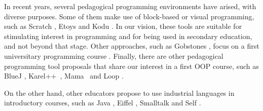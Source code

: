 


In recent years, several pedagogical programming environments have arised, with diverse purposes.
Some of them make use of block-based or visual programming, 
such as Scratch \cite{malan_scratch_2007}, Etoys \cite{lee_empowering_2011} and Kodu \cite{kodu}. 
In our vision, these tools are suitable for stimulating interest in programming and for being used in secondary education, and not beyond that stage.
Other approaches, such as Gobstones \cite{lopez_nombre_2012}, focus on a first universitary programming course%
.
Finally, there are other pedagogical programming tool proposals that share our interest in a first OOP course, such as BlueJ \cite{bennedsen_bluej_2010}, Karel++~\cite{bergin_karel++:_1996}, Mama~\cite{harrisonmama} and Loop \cite{griggio_programming_2011}.

On the other hand, other educators propose to use industrial languages in introductory courses, such as Java \cite{kolling2001guidelines}, Eiffel \cite{meyer1993towards, broy_outside-method_2003}, Smalltalk \cite{ducasse2006squeak} and Self \cite{Unga87a}.


